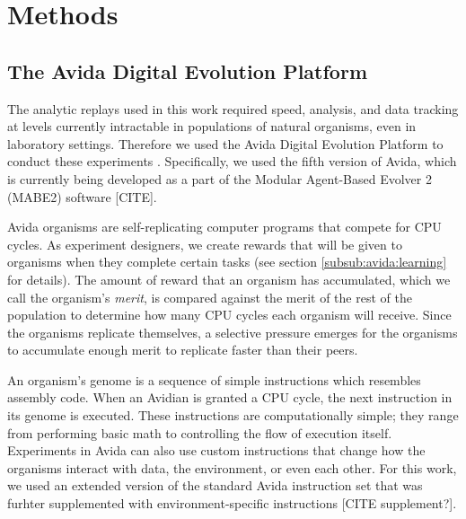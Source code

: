 
\section{Methods}

\subsection{The Avida Digital Evolution Platform}
\label{sub-avida}
The analytic replays used in this work required speed, analysis, and data tracking at levels currently intractable in populations of natural organisms, even in laboratory settings.
Therefore we used the Avida Digital Evolution Platform to conduct these experiments \citep{ofriaAvidaSoftwarePlatform2004a}.
Specifically, we used the fifth version of Avida, which is currently being developed as a part of the Modular Agent-Based Evolver 2 (MABE2) software [CITE].

Avida organisms are self-replicating computer programs that compete for CPU cycles. 
As experiment designers, we create rewards that will be given to organisms when they complete certain tasks (see section \ref{subsub:avida:learning} for details).
The amount of reward that an organism has accumulated, which we call the organism's \textit{merit}, is compared against the merit of the rest of the population to determine how many CPU cycles each organism will receive. 
Since the organisms replicate themselves, a selective pressure emerges for the organisms to accumulate enough merit to replicate faster than their peers. 

An organism's genome is a sequence of simple instructions which resembles assembly code. 
When an Avidian is granted a CPU cycle, the next instruction in its genome is executed. 
These instructions are computationally simple; they range from performing basic math to controlling the flow of execution itself. 
Experiments in Avida can also use custom instructions that change how the organisms interact with data, the environment, or even each other. 
For this work, we used an extended version of the standard Avida instruction set that was furhter supplemented with environment-specific instructions [CITE supplement?]. 

